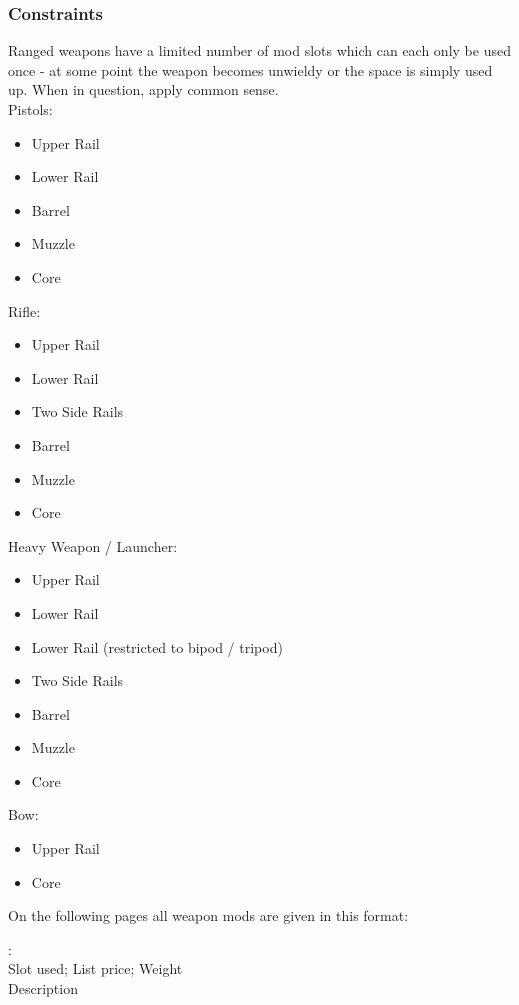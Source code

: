 \documentclass[12pt,a4paper,openany]{book}
\newenvironment{exampleblock}[1][1]
{\hfill\begin{minipage}{\dimexpr\textwidth-#1cm}}
{\end{minipage}\par}
\newcommand{\ul}[1]{\underline{\smash{#1}}}
\newcommand{\weaponmod}[5]{
	\textbf{\ul{#1}}:\\
	#3; #4; #5\\
	#2
	\par
}
\begin{document}
	\subsubsection{Constraints}
	Ranged weapons have a limited number of mod slots which can each only be used once - at some point the weapon becomes unwieldy or the space is simply used up. When in question, apply common sense.\\
	Pistols:
	\vspace{-10mm}
	\begin{itemize}
		\setlength\itemsep{-8mm}
		\item Upper Rail
		\item Lower Rail
		\item Barrel
		\item Muzzle
		\item Core
	\end{itemize}
	Rifle:
	\vspace{-10mm}
	\begin{itemize}
		\setlength\itemsep{-8mm}
		\item Upper Rail
		\item Lower Rail
		\item Two Side Rails
		\item Barrel
		\item Muzzle
		\item Core
	\end{itemize}
	Heavy Weapon / Launcher:
	\vspace{-10mm}
	\begin{itemize}
		\setlength\itemsep{-8mm}
		\item Upper Rail
		\item Lower Rail
		\item Lower Rail (restricted to bipod / tripod)
		\item Two Side Rails
		\item Barrel
		\item Muzzle
		\item Core
	\end{itemize}
	Bow:
	\vspace{-10mm}
	\begin{itemize}
		\setlength\itemsep{-8mm}
		\item Upper Rail
		\item Core
	\end{itemize}
	On the following pages all weapon mods are given in this format:\par
	\vspace{-5mm}
	\begin{exampleblock}
		\weaponmod{Name}{Description}{Slot used}{List price}{Weight}
	\end{exampleblock}
\end{document}
